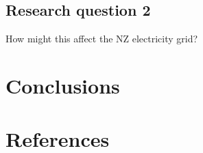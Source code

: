 \documentclass[]{article}
\begin{document}
\subsection{Research question 2}\label{research-question-2}

How might this affect the NZ electricity grid?

\section{Conclusions}\label{conclusions}

\section{References}\label{references}
\end{document}
